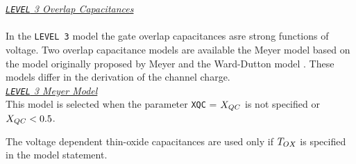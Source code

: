 \noindent\underline{\sl \large {\tt LEVEL} 3 Overlap Capacitances}\\[0.1in]
\\[0.1in]
In the {\tt LEVEL 3} model the gate overlap capacitances
asre strong functions of voltage.
Two overlap capacitance models are available
the Meyer model based on the model originally proposed by Meyer \cite{meyer:71}
and the Ward-Dutton model
\cite{ward:dutton:78,oh:ward:80}. These models differ in the derivation of the
channel charge.\\[0.2in]

\noindent\underline{\sl \large {\tt LEVEL} 3 Meyer Model}\\[0.1in]
This model is selected when the parameter {\tt XQC} = $X_{QC}$ is not specified or
$X_{QC} < 0.5$.

The voltage dependent thin-oxide capacitances are used only if $T_{OX}$ is
specified in the model statement.

